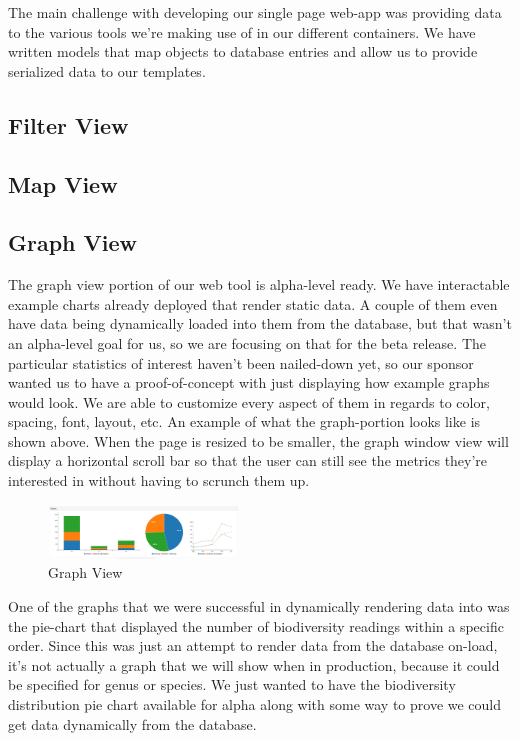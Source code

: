 \documentclass[journal]{IEEEtran}
\begin{document}
The main challenge with developing our single page web-app was providing data
to the various tools we’re making use of in our different containers. We have
written models that map objects to database entries and allow us to provide
serialized data to our templates.

\subsection{Filter View}

\subsection{Map View}

\subsection{Graph View}
The graph view portion of our web tool is alpha-level ready. We have
interactable example charts already deployed that render  static data. A couple
of them even have data being dynamically loaded into them from the database,
but that wasn’t an alpha-level goal for us, so we are focusing on that for the
beta release. The particular statistics of interest haven’t been nailed-down
yet, so our sponsor wanted us to have a proof-of-concept with just displaying
how example graphs would look. We are able to customize every aspect of them in
regards to color, spacing, font, layout, etc. An example of what the
graph-portion looks like is shown above. When the page is resized to be
smaller, the graph window view will display a horizontal scroll bar so that the
user can still see the metrics they’re interested in without having to scrunch
them up.

\begin{figure}[h]
\caption{Graph View}
\centering
\includegraphics[width=0.45\textwidth]{images/figure_6.jpg}
\end{figure}

One of the graphs that we were successful in dynamically rendering data into
was the pie-chart that displayed the number of biodiversity readings within a
specific order. Since this was just an attempt to render data from the database
on-load, it’s not actually a graph that we will show when in production,
because it could be specified for genus or species. We just wanted to have the
biodiversity distribution pie chart available for alpha along with some way to
prove we could get data dynamically from the database.
\end{document}
